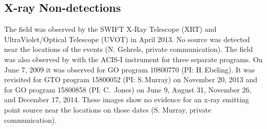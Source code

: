 \subsection{X-ray Non-detections}\label{sec:Xray}

The  field was observed by the SWIFT X-Ray Telescope (XRT)
and UltraViolet/Optical Telescope (UVOT) in April 2013.  No source was
detected near the locations of the \spock events (N. Gehrels, private
communication).  The field was also observed by \Chandra with the
ACIS-I instrument for three separate programs.  On June 7, 2009 it was
observed for GO program 10800770 (PI: H.\,Ebeling).  It was revisited
for GTO program 15800052 (PI: S.\,Murray) on November 20, 2013 and for
GO program 15800858 (PI: C.\, Jones) on June 9, August 31, November
26, and December 17, 2014. These \Chandra images show no evidence for
an x-ray emitting point source near the \spock locations on those
dates (S. Murray, private communication).
